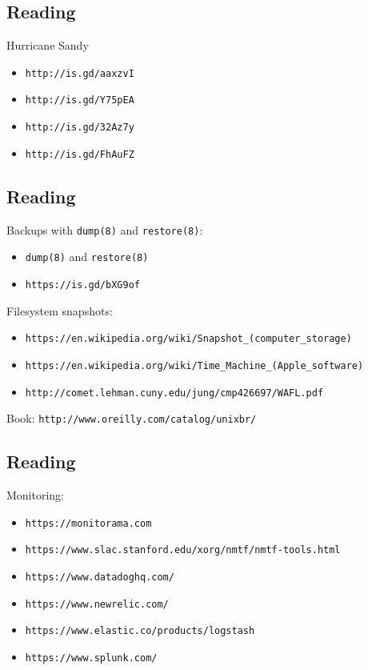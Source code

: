 \documentclass[xga]{xdvislides}
\begin{document}
\subsection{Reading}
Hurricane Sandy
\begin{itemize}
	\item \verb+http://is.gd/aaxzvI+
	\item \verb+http://is.gd/Y75pEA+
	\item \verb+http://is.gd/32Az7y+
	\item \verb+http://is.gd/FhAuFZ+
\end{itemize}

\subsection{Reading}
Backups with {\tt dump(8)} and {\tt restore(8)}:
\begin{itemize}
	\item \verb+dump(8)+ and \verb+restore(8)+
	\item \verb+https://is.gd/bXG9of+
\end{itemize}
\vspace{.5in}

Filesystem snapshots:
\begin{itemize}
	\item \verb+https://en.wikipedia.org/wiki/Snapshot_(computer_storage)+
	\item \verb+https://en.wikipedia.org/wiki/Time_Machine_(Apple_software)+
	\item \verb+http://comet.lehman.cuny.edu/jung/cmp426697/WAFL.pdf+
\end{itemize}
\vspace{.5in}
Book: \verb+http://www.oreilly.com/catalog/unixbr/+



\subsection{Reading}

Monitoring:
\begin{itemize}
	\item {\tt https://monitorama.com}
	\item {\tt https://www.slac.stanford.edu/xorg/nmtf/nmtf-tools.html}
	\item {\tt https://www.datadoghq.com/}
	\item {\tt https://www.newrelic.com/}
	\item {\tt https://www.elastic.co/products/logstash}
	\item {\tt https://www.splunk.com/}
\end{itemize}
\end{document}
